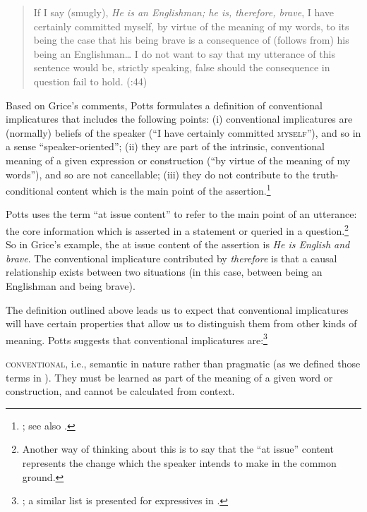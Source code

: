 \begin{quote}
If I say (smugly), \textit{He is an Englishman; he is, therefore, brave}, I have certainly committed myself, by virtue of the meaning of my words, to its being the case that his being brave is a consequence of (follows from) his being an Englishman…  I do not want to say that my utterance of this sentence would be, strictly speaking, false should the consequence in question fail to hold.  (\citealt{Grice1975}:44)
\end{quote}


Based on Grice’s comments, Potts formulates a definition of conventional implicatures that includes the following points: (i) conventional implicatures are (normally) beliefs of the speaker (“I have certainly committed \textsc{myself}”), and so in a sense “speaker-oriented”; (ii) they are part of the intrinsic, conventional meaning of a given expression or construction (“by virtue of the meaning of my words”), and so are not cancellable; (iii) they do not contribute to the truth-conditional content which is the main point of the assertion.\footnote{\citet{Potts2005,Potts2012}; see also \citet[39]{Horn1997}.}



Potts uses the term “at issue content” to refer to the main point of an utterance: the core information which is asserted in a statement or queried in a question.\footnote{Another way of thinking about this is to say that the “at issue” content represents the change which the speaker intends to make in the common ground.} So in Grice’s example, the at issue content of the assertion is \textit{He is English and brave}. The conventional implicature contributed by \textit{therefore} is that a causal relationship exists between two situations (in this case, between being an Englishman and being brave).



The definition outlined above leads us to expect that conventional implicatures will have certain properties that allow us to distinguish them from other kinds of meaning. Potts suggests that conventional implicatures are:\footnote{\citet{Potts2015}; a similar list is presented for expressives in \citet{Potts2007c}.}


\textsc{conventional}, i.e., semantic in nature rather than pragmatic (as we defined those terms in ). They must be learned as part of the meaning of a given word or construction, and cannot be calculated from context.



